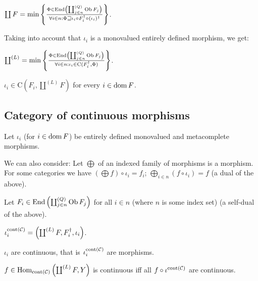 $\coprod F = \min \left\{ \frac{ \Phi \in \operatorname{End} \left( \coprod^{(Q)}_{j \in n}
\operatorname{Ob} F_j \right) }{ \forall i \in n : \Phi
\sqsupseteq \iota_i \circ F_i^{\dagger} \circ (\iota_i)^{\dagger} }\right\}$.

Taking into account that $\iota_i$ is a monovalued entirely defined morphism,
we get:

\begin{obvious}
$\coprod^{(L)} = \min \left\{ \frac{ \Phi \in \operatorname{End} \left( \coprod^{(Q)}_{j \in
n} \operatorname{Ob} F_j \right) }{ \forall i \in n : \iota_i
\in \mathrm{C} (F_i^{\dagger} , \Phi) }\right\}$.{\hspace*{\fill}}{\medskip}
\end{obvious}

\begin{cor}
  $\iota_i \in \mathrm{C} \left( F_i , \coprod^{(L)} F \right)$ for every $i
  \in \operatorname{dom} F$.
\end{cor}

\subsection{Category of continuous morphisms}

Let $\iota_i$ (for $i \in \operatorname{dom} F$) be entirely defined monovalued and
metacomplete morphisms.

\begin{rem}
We can also consider: Let $\bigoplus$ of an indexed family of morphisms is a morphism.
For some categories we have $\left(
\bigoplus f \right) \circ \iota_i = f_i$; $\bigoplus_{i \in n} (f \circ
\iota_i) = f$ (a dual of the above).
\end{rem}

Let $F_i \in \operatorname{End} \left( \coprod^{(Q)}_{j \in n} \operatorname{Ob} F_j \right)$
for all $i \in n$ (where $n$ is some index set) (a self-dual of the above).

\begin{defn}
  $\iota^{\operatorname{cont} (\mathcal{C})}_i = \left( \coprod^{(L)} F ,
  F_i^{\dagger} , \iota_i \right)$.
\end{defn}

\begin{prop}
  $\iota_i$ are continuous, that is $\iota^{\operatorname{cont}
  (\mathcal{C})}_i$ are morphisms.
\end{prop}

\begin{lem}
  $f \in \operatorname{Hom}_{\operatorname{cont} (\mathcal{C})} \left(
  \coprod^{(L)} F , Y \right)$  is continuous iff all $f \circ
  \iota^{\operatorname{cont} (\mathcal{C})}$ are continuous.
\end{lem}

